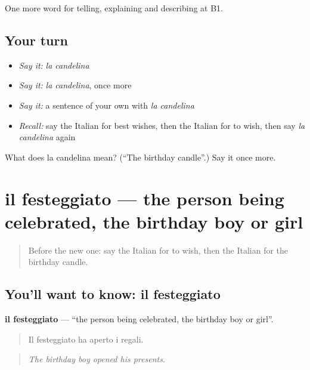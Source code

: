 \begin{grammarlens}[title={What you've built}]
One more word for telling, explaining and describing at B1.
\end{grammarlens}

\subsection*{Your turn}
\begin{itemize}
\raggedright
  \item \emph{Say it:} \emph{la candelina}
  \item \emph{Say it:} \emph{la candelina}, once more
  \item \emph{Say it:} a sentence of your own with \emph{la candelina}
  \item \emph{Recall:} say the Italian for best wishes, then the Italian for to wish, then say \emph{la candelina} again
\end{itemize}

\begin{tcolorbox}[breakable,colback=teal!4,colframe=teal!35!black,title={Before you move on}]
What does la candelina mean? (\textquotedblleft{}The birthday candle\textquotedblright{}.) Say it once more.
\end{tcolorbox}
\section[il festeggiato]{il festeggiato — the person being celebrated, the birthday boy or girl}

\label{lesson:IT-C316-festeggiato}



\begin{quote}
Before the new one: say the Italian for to wish, then the Italian for the birthday candle.
\end{quote}

\subsection*{You'll want to know: il festeggiato}
\textbf{il festeggiato} — \textquotedblleft{}the person being celebrated, the birthday boy or girl\textquotedblright{}.

\begin{quote}
Il festeggiato ha aperto i regali.
\end{quote}

\begin{quote}
\emph{The birthday boy opened his presents.}
\end{quote}

